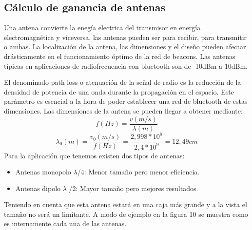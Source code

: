 \documentclass[paper=a4, fontsize=11pt,twoside]{scrartcl}	%
\begin{document}
    \subsection{Cálculo de ganancia de antenas}
            Una antena convierte la enegía electrica del transmisor en energía electromagnética y viceversa, las antenas pueden ser 
            para recibir, para transmitir o ambas. La localización de la antena, las dimensiones y el diseño pueden afectar drásticamente
            en el funcionamiento óptimo de la red de beacons. 
            Las antenas típicas en aplicaciones de radiofrecuencia con bluetooth son de -10dBm a 10dBm.

            El denominado path loss o atenuación de la señal de radio es la reducción de la densidad de potencia de una onda durante la 
            propagación en el espacio. Este parámetro es esencial a la hora de poder establecer una red de bluetooth de estas dimensiones.
            Las dimensiones de la antena se pueden llegar a obtener mediante:
            \begin{equation}
                f(Hz)=\frac{v(m/s)}{\lambda(m)}
            \end{equation}
            \begin{equation}
                \lambda_0(m)=\frac{v_0(m/s)}{f(Hz)} = \frac{2,998*10^8}{2,4*10^9} = 12,49 cm
            \end{equation}
            Para la aplicación que tenemos existen dos tipos de antenas:
            \begin{itemize}
                \item  Antenas monopolo $\lambda$/4: Menor tamaño pero menor eficiencia. 
                \item  Antenas dipolo $\lambda$ /2: Mayor tamaño pero mejores resultados.
            \end{itemize}
            Teniendo en cuenta que esta antena estará en una caja más grande y a la vista el tamaño no será un limitante.
            A modo de ejemplo en la figura 10 se muestra como es internamente cada una de las antenas.
\end{document}
